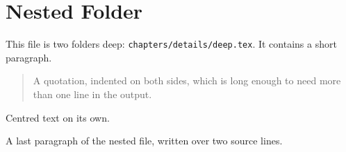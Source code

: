 \section{Nested Folder}
This file is two folders deep: \texttt{chapters/details/deep.tex}.
It contains a short paragraph.

\begin{quote}
A quotation, indented on both sides, which is long enough to need more than one line in the output.
\end{quote}

\begin{center}
Centred text on its own.
\end{center}

A last paragraph of the nested file,
written over two source lines.
